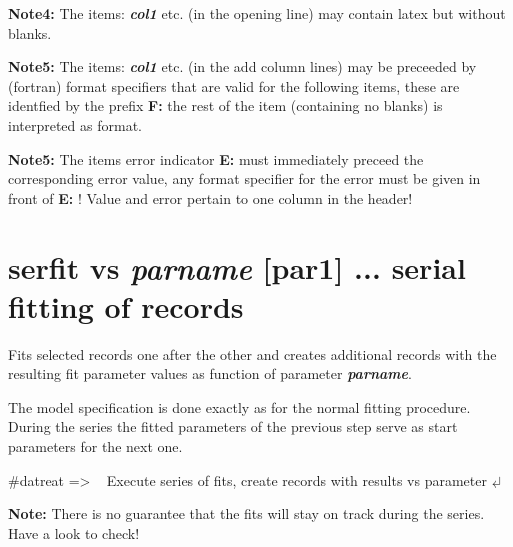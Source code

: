 \documentclass[11pt,fleqn]{book} %
\newcommand{\linespace}{\vspace{4ex}}
\newcommand{\return}{$\carriagereturn$} %
\newcommand{\sysprompt}{{\color{green}...\textgreater} ~ }
\newcommand{\dtrprompt}{{\color{blue}\#datreat =\textgreater} ~ }
\newcommand{\enter}[1]{{\color{red} \bf #1}}
\newcommand{\cmdl}[2]{{\color{red}{\bf \underline{#1} #2}}}
\newcommand{\var}[1]{{\color{red} \bf \it #1}}
\newcommand{\opt}[1]{[#1]}
\newcommand{\desc}[1]{\hskip 0.5cm {\color{descgray} #1}}
\newcommand{\expl}[1]{\hskip 0.5cm {\color{explgray} #1}}
\begin{document}
\linespace
{\bf Note4:} The items: \var{col1} etc. (in the opening line) may contain latex but without blanks.

\linespace
{\bf Note5:} The items: \var{col1} etc. (in the add column lines) may be preceeded by (fortran) format
specifiers that are valid for the following items, these are identfied by the prefix \textbf{F:} the
rest of the item (containing no blanks) is interpreted as format.

\linespace
{\bf Note5:} The items error indicator {\bf E: } must immediately preceed the corresponding error value,
any format specifier for the error must be given in front of {\bf E: }!
Value and error pertain to one column in the header!

\section{serfit vs \var{parname} \opt{par1} ...  \desc{serial fitting of records}}

\begin{exercise}
Fits selected records one after the other and creates additional records with the resulting
fit parameter values as function of parameter \var{parname}.
\end{exercise}

The model specification is done exactly as for the normal fitting procedure.
During the series the fitted parameters of the previous step serve as 
start parameters for the next one.

\begin{corollary}
\dtrprompt \cmdl{serfit}{vs \var{parameter}  }  \expl{Execute series of fits, create records with results vs parameter}  \return  
\end{corollary}

\linespace
{\bf Note:} There is no guarantee that the fits will stay on track during the series. Have a look to check!

\linespace
\end{document}
